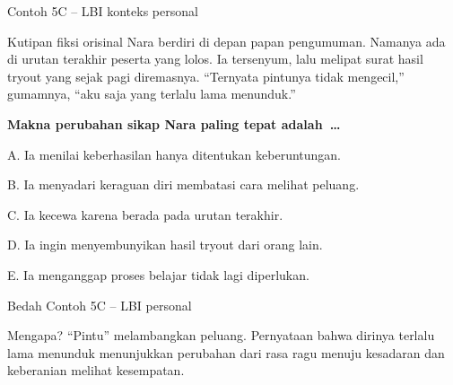 \begin{frame}[shrink=10]{Contoh 5C -- LBI konteks personal}
  \begin{block}{Kutipan fiksi orisinal}
    Nara berdiri di depan papan pengumuman. Namanya ada di urutan terakhir peserta yang lolos. Ia tersenyum, lalu melipat surat hasil tryout yang sejak pagi diremasnya. ``Ternyata pintunya tidak mengecil,'' gumamnya, ``aku saja yang terlalu lama menunduk.''
  \end{block}
  {\bfseries Makna perubahan sikap Nara paling tepat adalah~\ldots}\par
  \vspace{0.07cm}
  {\fontsize{9.6}{11.8}\selectfont
  A. Ia menilai keberhasilan hanya ditentukan keberuntungan.\par\vspace{0.04cm}
  B. Ia menyadari keraguan diri membatasi cara melihat peluang.\par\vspace{0.04cm}
  C. Ia kecewa karena berada pada urutan terakhir.\par\vspace{0.04cm}
  D. Ia ingin menyembunyikan hasil tryout dari orang lain.\par\vspace{0.04cm}
  E. Ia menganggap proses belajar tidak lagi diperlukan.}
\end{frame}

\begin{frame}{Bedah Contoh 5C -- LBI personal}
  \vspace{0.20cm}
  \begin{block}{Mengapa?}
    ``Pintu'' melambangkan peluang. Pernyataan bahwa dirinya terlalu lama menunduk menunjukkan perubahan dari rasa ragu menuju kesadaran dan keberanian melihat kesempatan.
  \end{block}
  {\fontsize{10.6}{13.2}\selectfont
  \par\vspace{0.16cm}
  }
\end{frame}

